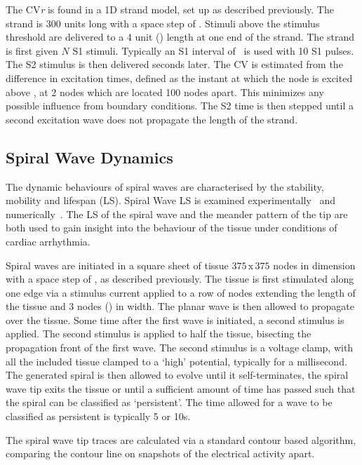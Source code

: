 The CV\emph{r} is found in a 1D strand model, set up as described previously.
The strand is 300 units long with a space step of .
Stimuli above the stimulus threshold are delivered to a 4 unit () length
at one end of the strand.
The strand is first given $N$ S1 stimuli.
Typically an S1 interval of \ is used with 10 S1 pulses.
The S2 stimulus is then delivered  seconds later.
The CV is estimated from the difference in excitation times, defined as the
instant at which the node is excited above , at 2 nodes which are
located 100 nodes apart.
This minimizes any possible influence from boundary conditions.
The S2 time is then stepped until a second excitation wave
does not propagate the length of the strand.


\subsection{Spiral Wave Dynamics}

The dynamic behaviours of spiral waves are characterised by the stability,
mobility and lifespan (LS).
Spiral Wave LS is examined experimentally~\cite{Kumagai1997} and
numerically~\cite{Qu2000,Nygren2001,Cherry2007,Clayton2005,Zhang2003}.
The LS of the spiral wave and the meander pattern of the tip are both used to
gain insight into the behaviour of the tissue under conditions of cardiac
arrhythmia.

Spiral waves are initiated in a square sheet of tissue $375\,\text{x}\,375$
nodes in dimension with a space step of , as described previously.  The
tissue is first stimulated along one edge via a stimulus current applied to a
row of nodes extending the length of the tissue and 3 nodes () in width.
The planar wave is then allowed to propagate over the tissue.  Some time after
the first wave is initiated, a second stimulus is applied.  The second stimulus
is applied to half the tissue, bisecting the propagation front of the first wave.
The second stimulus is a voltage clamp, with all the included tissue clamped to
a `high' potential, typically  for a millisecond.  The
generated spiral is then allowed to evolve until it self-terminates, the spiral
wave tip exits the tissue or until a sufficient amount of time has passed such
that the spiral can be classified as `persistent'.  The time allowed for a wave
to be classified as persistent is typically 5 or \unit{10}{s}.

The spiral wave tip traces are calculated via a standard contour based
algorithm, comparing the  contour line on snapshots of the electrical
activity  apart.

